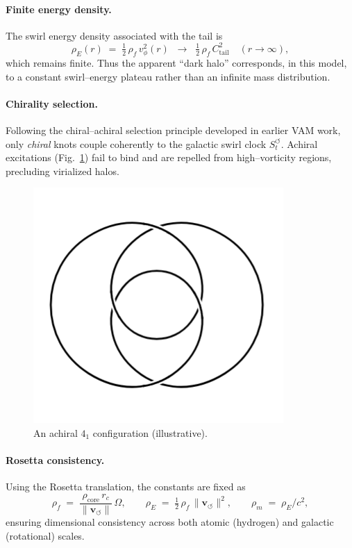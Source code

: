 \documentclass[11pt]{article}
\newcommand{\rhof}{\rho_{\!f}}                           %
\newcommand{\rhocore}{\rho_{\mathrm{core}}}
\newcommand{\rc}{r_c}                                    %
\providecommand{\rc}{r_c}
\begin{document}
    \paragraph{Finite energy density.}
    The swirl energy density associated with the tail is
    \begin{equation}
        \rho_{\!E}(r) \;=\; \tfrac12\,\rhof\,v_\phi^2(r)
        \;\;\longrightarrow\;\; \tfrac12\,\rhof\,C_\text{tail}^2
        \quad (r\to\infty),
    \end{equation}
    which remains finite. Thus the apparent “dark halo” corresponds, in this model, to a constant swirl–energy plateau rather than an infinite mass distribution.

    \paragraph{Chirality selection.}
    Following the chiral–achiral selection principle developed in earlier VAM work, only \emph{chiral} knots couple coherently to the galactic swirl clock $S_t^{\boldsymbol{\circlearrowleft}}$. Achiral excitations (Fig.~\ref{fig:4-1}) fail to bind and are
    repelled from high–vorticity regions, precluding virialized halos.

    \begin{figure}[htbp]
      \centering
      \includegraphics[width=0.3\linewidth]{figures/4_1}
      \caption{An achiral \(4_1\) configuration (illustrative).}
      \label{fig:4-1}
    \end{figure}

    \paragraph{Rosetta consistency.}
    Using the Rosetta translation, the constants are fixed as
    \[
        \rhof \;=\; \frac{\rhocore\,\rc}{\lVert\mathbf{v}_{\!\boldsymbol{\circlearrowleft}}\rVert}\,\Omega,\qquad
        \rho_{\!E} \;=\; \tfrac12\,\rhof\,\lVert\mathbf{v}_{\!\boldsymbol{\circlearrowleft}}\rVert^2,\qquad
        \rho_{\!m} \;=\; \rho_{\!E}/c^2,
    \]
    ensuring dimensional consistency across both atomic (hydrogen) and galactic (rotational) scales.
\end{document}

